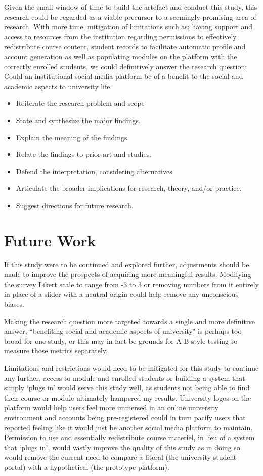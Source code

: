 \documentclass[lettersize,journal]{IEEEtran}
\begin{document}
Given the small window of time to build the artefact and conduct this study, this research could be regarded as a viable precursor to a seemingly promising area of research. With more time, mitigation of 
limitations such as; having support and access to resources from the institution regarding permissions to effectively redistribute course content, student records to facilitate automatic profile and
account generation as well as populating modules on the platform with the correctly enrolled students, we could definitively answer the research question: Could an institutional social media platform be of a benefit
to the social and academic aspects to university life.


\begin{itemize}
        \item Reiterate the research problem and scope
        \item State and synthesize the major findings.
        \item Explain the meaning of the findings.
        \item Relate the findings to prior art and studies.
        \item Defend the interpretation, considering alternatives.
        \item Articulate the broader implications for research, theory, and/or practice.
        \item Suggest directions for future research.
\end{itemize}


\section{Future Work}
	If this study were to be continued and explored further, adjustments should be made to improve the prospects of acquiring more meaningful results. Modifying the survey Likert scale to range 
	from -3 to 3 or removing numbers from it entirely in place of a slider with a neutral origin could help remove any unconscious biases.

	Making the research question more targeted towards a single and more definitive answer, ``benefiting social and academic aspects of university" is perhaps too broad for one study,
	or this may in fact be grounds for A B style testing to measure	those metrics separately.

	Limitations and restrictions would need to be mitigated for this study to continue any further, access to module and enrolled students or building a system that simply
	`plugs in' would serve this study well, as students not being able to find their course or module ultimately hampered my results. University logos on the platform  would help 
	users feel more immersed in an online university environment and accounts being pre-registered could in turn pacify users that reported feeling like it would just be another social media
	platform to maintain. Permission to use and essentially redistribute course materiel, in lieu of a system that `plugs in', would vastly improve the quality of this study as in doing so would
	remove the current need to compare a literal (the university student portal) with a hypothetical (the prototype platform).
\end{document}
